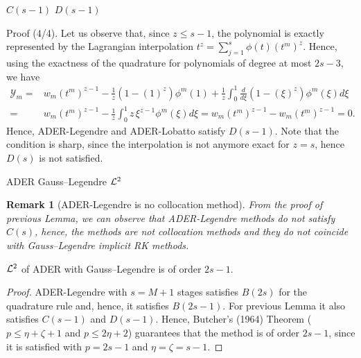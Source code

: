 \documentclass[9pt,compress,t,aspectratio=169]{beamer}
\newtheorem{remark}{Remark}
\begin{document}
\begin{frame}{$C(s-1)$ $D(s-1)$}
	\begin{block}{Proof (4/4).}
		Let us observe that, since $z\leq s-1$, the polynomial is exactly represented by the Lagrangian interpolation $t^z = \sum_{j=1}^s \phi(t) (t^m)^z$. Hence, using the exactness of the quadrature for polynomials of degree at most $2s-3$, we have
		 \begin{align*}
			 \mathcal{Y}_m=& w_m (t^m)^{z-1} - \frac1z \left(1-(1)^z\right) \phi^m(1) + \frac1z\int_0^1 \frac{d}{d\xi}\left(1-(\xi)^z\right)\phi^m(\xi) d\xi \\
			 =&  w_m (t^m)^{z-1} -   \frac1z\int_0^1 z\, \xi^{z-1}\phi^m(\xi) d\xi  =w_m (t^m)^{z-1}-w_m (t^m)^{z-1}=0 .
		 \end{align*}
		Hence, ADER-Legendre and ADER-Lobatto satisfy $D(s-1)$. Note that the condition is sharp, since the interpolation is not anymore exact for $z=s$, hence $D(s)$ is not satisfied.
	\end{block}
\end{frame}


\begin{frame}{ADER Gauss--Legendre $\mathcal{L}^2$}
	\begin{remark}[ADER-Legendre is no collocation method]
		From the proof of previous Lemma, we can observe that ADER-Legendre methods do not satisfy $C(s)$, hence, the methods are not collocation methods and they do not coincide with Gauss--Legendre implicit RK methods.
	\end{remark}
	\begin{theorem}
		$\mathcal{L}^2$ of ADER with Gauss--Legendre is of order $2s-1$.
	\end{theorem}
	\begin{proof}
		 ADER-Legendre with $s=M+1$ stages satisfies $B(2s)$ for the quadrature rule and, 
		 hence, it satisfies $B(2s-1)$. For previous Lemma it also satisfies $C(s-1)$ and $D(s-1)$. 
		 Hence, Butcher's (1964) Theorem ($p\leq \eta +\zeta +1$ and $p\leq 2\eta +2$) guarantees that the method is of order $2s-1$, 
		 since it is satisfied with $p=2s-1$ and $\eta=\zeta=s-1$.
	\end{proof}
\end{frame}
	
\end{document}
